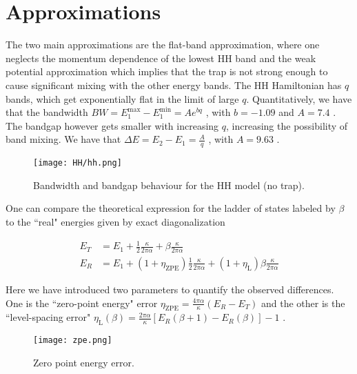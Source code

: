 \documentclass[twocolumn, 10pt, aps, superscriptaddress, floatfix, showpacs, prb, citeautoscript]{revtex4-1}
\begin{document}
\section{Approximations}\label{app:approximations}
The two main approximations are the flat-band approximation, where one
neglects the momentum dependence of the lowest HH band and the weak
potential approximation which implies that the trap is not strong
enough to cause significant mixing with the other energy bands.  The
HH Hamiltonian has $q$ bands, which get exponentially flat in the
limit of large $q$. Quantitatively, we have that the bandwidth $BW =
E_1^{\text{max}} - E_1^{\text{min}} = A e^{b q}$ , with $b = -1.09$
and $A = 7.4$ . The bandgap however gets smaller with increasing $q$,
increasing the possibility of band mixing. We have that $\Delta E =
E_2 - E_1 = \frac{A}{q}$ , with $A=9.63$ .


\begin{figure}[htb]
  \centerline{\texttt{[image: HH/hh.png]}}
  \caption{Bandwidth and bandgap behaviour for the HH model (no trap).}
  \label{fig:energy_bands}
\end{figure}


One can compare the theoretical expression for the ladder of states labeled by $\beta$ 
to the ``real" energies given by exact diagonalization

\begin{subequations}
  \begin{align}
    E_T &= E_1 + \frac{1}{2}\frac{\kappa}{2\pi\alpha} + \beta \frac{\kappa}{2\pi\alpha}\\
    E_R &= E_1 +
          (1+\eta_{\text{ZPE}})\frac{1}{2}\frac{\kappa}{2\pi\alpha} +
          (1+\eta_{\text{L}})\beta \frac{\kappa}{2\pi\alpha}
  \end{align}   
\end{subequations}
  


Here we have introduced two parameters to quantify the observed
differences. One is the ``zero-point energy" error $\eta_{\text{ZPE}} =
\frac{4\pi\alpha}{\kappa} (E_R - E_T)$ and the other is the
``level-spacing error" $\eta_{\text{L}} (\beta) = \frac{2\pi
\alpha}{\kappa} [E_R(\beta+1) - E_R(\beta)] -1$ .

\begin{figure}[htb]
  \centerline{\texttt{[image: zpe.png]}}
  \caption{Zero point energy error.}
  \label{fig:zpe}
\end{figure}
\end{document}
